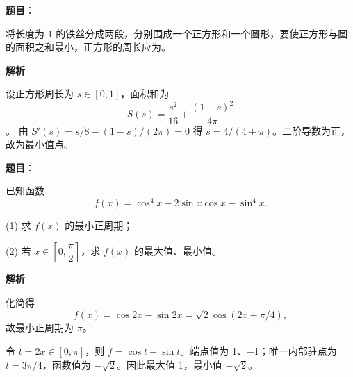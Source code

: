 \begin{answer}

\textbf{题目}：

将长度为 1 的铁丝分成两段，分别围成一个正方形和一个圆形，要使正方形与圆的面积之和最小，正方形的周长应为\gkblank{}。

\textbf{解析}

设正方形周长为 \(s\in[0,1]\)，面积和为
\nopagebreak[4]
\[
S(s)=\frac{s^2}{16}+\frac{(1-s)^2}{4\pi}
\]
。
由 \(S'(s)=s/8-(1-s)/(2\pi)=0\) 得 \(s=4/(4+\pi)\)。二阶导数为正，故为最小值点。


\end{answer}

\begin{answer}

\textbf{题目}：

已知函数
\nopagebreak[4]
\[
    f(x)=\cos^4x-2\sin x\cos x-\sin^4x.
\]

    (1) 求 \(f(x)\) 的最小正周期；

    (2) 若 \(x\in\left[0,\dfrac{\pi}{2}\right]\)，求 \(f(x)\) 的最大值、最小值。

\textbf{解析}


化简得
\nopagebreak[4]
\[
f(x)=\cos2x-\sin2x=\sqrt2\cos(2x+\pi/4),
\]
故最小正周期为 \(\pi\)。


令 \(t=2x\in[0,\pi]\)，则 \(f=\cos t-\sin t\)。端点值为 1、$-$1；唯一内部驻点为 \(t=3\pi/4\)，函数值为 \(-\sqrt2\)。因此最大值 1，最小值 \(-\sqrt2\)。



\end{answer}
